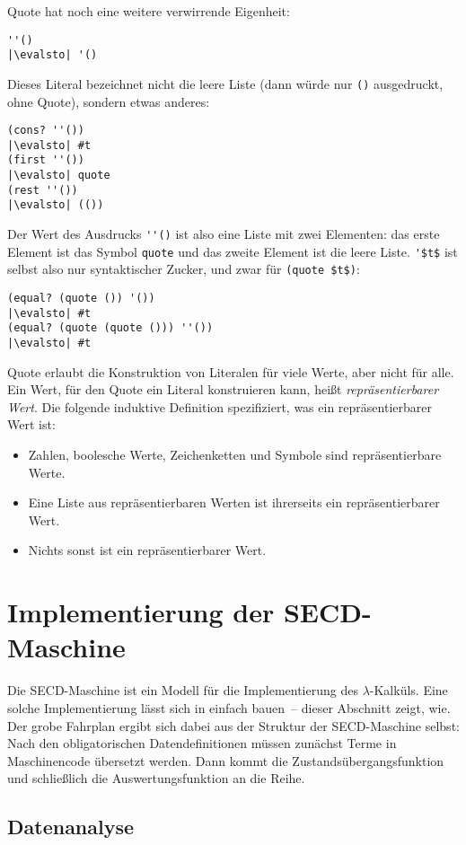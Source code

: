 Quote hat noch eine weitere verwirrende Eigenheit:
%
\begin{lstlisting}
''()
|\evalsto| '()
\end{lstlisting}
%
Dieses Literal bezeichnet nicht die leere Liste (dann würde nur
\lstinline{()} ausgedruckt, ohne Quote), sondern etwas anderes:
%
\begin{lstlisting}
(cons? ''())
|\evalsto| #t
(first ''())
|\evalsto| quote
(rest ''())
|\evalsto| (())
\end{lstlisting}
%
Der Wert des Ausdrucks \verb|''()| ist also eine Liste mit zwei
Elementen: das erste Element ist das Symbol \lstinline{quote} und das
zweite Element ist die leere Liste.  \lstinline{'$t$}
ist selbst also nur syntaktischer Zucker, und zwar für
\lstinline{(quote $t$)}:
%
\begin{lstlisting}
(equal? (quote ()) '())
|\evalsto| #t
(equal? (quote (quote ())) ''())
|\evalsto| #t
\end{lstlisting}
%
Quote erlaubt die Konstruktion von Literalen für viele Werte, aber
nicht für alle.  Ein Wert, für den Quote ein Literal konstruieren kann,
heißt \textit{repräsentierbarer
  Wert}.  Die folgende induktive
Definition spezifiziert, was ein repräsentierbarer Wert ist:
%
\begin{itemize}
\item Zahlen, boolesche Werte, Zeichenketten und Symbole sind
  repräsentierbare Werte.
\item Eine Liste aus repräsentierbaren Werten ist ihrerseits ein
  repräsentierbarer Wert. 
\item Nichts sonst ist ein repräsentierbarer Wert.
\end{itemize}

\section{Implementierung der SECD-Maschine}

Die SECD-Maschine ist ein Modell für die Implementierung des
$\lambda$-Kalküls.  Eine solche Implementierung lässt sich in
einfach bauen~-- dieser Abschnitt zeigt, wie.  Der grobe
Fahrplan ergibt sich dabei aus der Struktur der SECD-Maschine selbst:
Nach den obligatorischen Datendefinitionen müssen zunächst Terme in
Maschinencode übersetzt werden.  Dann kommt die
Zustandsübergangsfunktion und schließlich die Auswertungsfunktion an
die Reihe.

\subsection{Datenanalyse}
\label{sec:secd-datenanalyse}

